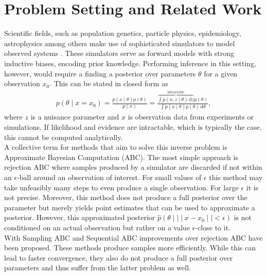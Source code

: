 \documentclass[12pt]{article}
\newcommand{\diff}{\,\text{d}}
\begin{document}
\section*{Problem Setting and Related Work}
Scientific fields, such as population genetics, particle physics, epidemiology, astrophysics among others make use of sophisticated simulators to model observed systems \citep{brehmer2020simulation, de2020simulation, delaunoy2020lightning,cranmer2020frontier, pritchard1999population}. These simulators serve as forward models with strong inductive biases, encoding prior knowledge. Performing inference in this setting, however, would require a finding a posterior over parameters $\theta$ for a given observation $x_0$. This can be stated in closed form as 
\begin{align}
	p(\theta\mid x=x_0) = \frac{p(x\mid \theta)p(\theta)}{p(x)} = \frac{\overbrace{\int p(x,z\mid \theta)\diff z}^{\text{intractable}} p(\theta)}{\int p(x\mid \theta)p(\theta) \diff \theta},
\end{align}
where $z$ is a nuisance parameter and $x$ is observation data from experiments or simulations. If likelihood and evidence are intractable, which is typically the case, this cannot be computed analytically.\\
A collective term for methods that aim to solve this inverse problem is Approximate Bayesian Computation (ABC). The most simple approach is rejection ABC \citep{pritchard1999population} where samples produced by a simulator are discarded if not within an $\epsilon$-ball around an observation of interest. For small values of $\epsilon$ this method may take unfeasibly many steps to even produce a single observation. For large $\epsilon$ it is not precise. Moreover, this method does not produce a full posterior over the parameter but merely yields point estimates that can be used to approximate a posterior. However, this approximated posterior $\hat{p}(\theta\mid  \mid\mid x-x_0 \mid\mid < \epsilon)$ is not conditioned on an actual observation but rather on a value $\epsilon$-close to it.\\
With Sampling ABC \citep{marjoram2003markov} and Sequential ABC \citep{beaumont2009adaptive,bonassi2015sequential} improvements over rejection ABC have been proposed. These methods produce samples more efficiently. While this can lead to faster convergence, they also do not produce a full posterior over parameters and thus suffer from the latter problem as well.
 
\end{document}
